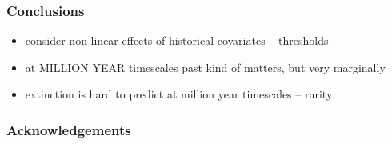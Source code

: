 \documentclass{beamer}
\begin{document}
\begin{frame}
  \frametitle{Conclusions}

  \begin{itemize}
    \item consider non-linear effects of historical covariates -- thresholds
    \item at MILLION YEAR timescales past kind of matters, but very marginally
    \item extinction is hard to predict at million year timescales -- rarity
  \end{itemize}
\end{frame}


\begin{frame}
  \frametitle{Acknowledgements}

\end{frame}
\end{document}
